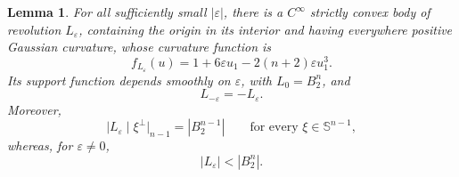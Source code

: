 \documentclass[11pt]{article}
\newtheorem{lemma}[theorem]{Lemma}
\theoremstyle{remark}
\newcommand{\Sph}{\mathbb{S}}
\begin{document}
\begin{lemma}\label{lem:nonsym-perturbation}
For all sufficiently small $|\varepsilon|$, there is a $C^\infty$ strictly
convex body of revolution $L_\varepsilon$, containing the origin in its
interior and having everywhere positive Gaussian curvature, whose curvature
function is
\[
 f_{L_\varepsilon}(u)
 =1+6\varepsilon u_1-2(n+2)\varepsilon u_1^3.
\]
Its support function depends smoothly on $\varepsilon$, with
$L_0=B_2^n$, and
\begin{equation}\label{eq:nonsym-parity}
 L_{-\varepsilon}=-L_\varepsilon.
\end{equation}
Moreover,
\begin{equation}\label{eq:nonsym-projection}
 \bigl|L_\varepsilon\mid\xi^\perp\bigr|_{n-1}
 =|B_2^{n-1}|
 \qquad\text{for every }\xi\in\Sph^{n-1},
\end{equation}
whereas, for $\varepsilon\ne0$,
\begin{equation}\label{eq:nonsym-volume-gap}
 |L_\varepsilon|<|B_2^n|.
\end{equation}
\end{lemma}
\end{document}
